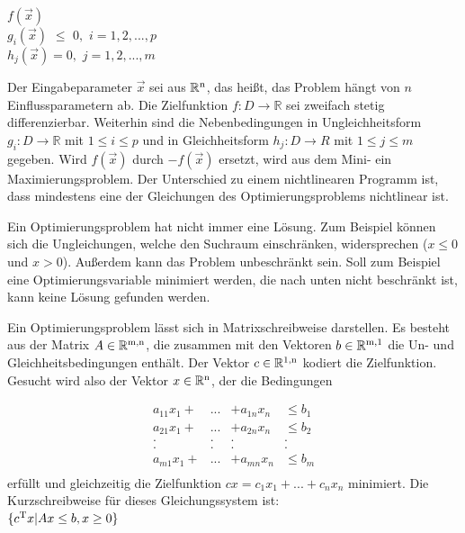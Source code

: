 \documentclass{like}
\begin{document}
\noindent\hspace*{3mm}%
$f(\vec{x}) $ \\
\noindent\hspace*{3mm}%
$g_i(\vec{x})$ $\leq$ $0,$ $i=1,2,...,p$  \\
\noindent\hspace*{50mm}%
$h_j(\vec{x})= 0,$ $j= 1,2,...,m$\\ 
\noindent\hspace*{50mm}%


Der Eingabeparameter $\vec{x}$ sei aus $\mathbb{R} \textsuperscript{n} $, das heißt, das Problem hängt von \(n\) Einflussparametern ab. Die Zielfunktion $f:D \rightarrow \mathbb{R} $ sei zweifach stetig differenzierbar. Weiterhin sind die Nebenbedingungen in Ungleichheitsform $g_i:D \rightarrow \mathbb{R}$ mit $1\leq i \leq p$ und in Gleichheitsform $h_j:D \rightarrow \!R$ mit $1\leq j \leq m$ gegeben.
Wird \(f(\vec{x})\) durch \(-f(\vec{x})\) ersetzt, wird aus dem Mini- ein Maximierungsproblem. Der Unterschied zu einem nichtlinearen Programm ist, dass mindestens eine der Gleichungen des Optimierungsproblems nichtlinear ist.

Ein Optimierungsproblem hat nicht immer eine Lösung. Zum Beispiel können sich die  Ungleichungen, welche den Suchraum einschränken, widersprechen ($x \leq 0 $ und $x > 0$). Außerdem kann das Problem unbeschränkt sein. Soll zum Beispiel eine Optimierungsvariable minimiert werden, die nach unten nicht beschränkt ist, kann keine Lösung gefunden werden. 

Ein Optimierungsproblem lässt sich in Matrixschreibweise darstellen. Es besteht aus der Matrix $A \in \mathbb{R} \textsuperscript{m,n}$, die zusammen mit den Vektoren $b \in \mathbb{R} \textsuperscript{m,1}$ die Un- und Gleichheitsbedingungen enthält. Der Vektor $c \in \mathbb{R} \textsuperscript{1,n}$ kodiert die Zielfunktion. Gesucht wird also der Vektor $x \in \mathbb{R} \textsuperscript{n}$, der die Bedingungen

\[  \begin{array}{cccc}
a_{11} x_1 + & ... & + a_{1n} x_n & \leq b_1 \\   	
a_{21} x_1 + & ... & + a_{2n} x_n & \leq b_2 \\ 
. & . & . & . \\
. & . & . & . \\
a_{m1} x_1 + & ... & + a_{mn} x_n & \leq b_m \\
\end{array}\] 
erfüllt und gleichzeitig die Zielfunktion 
$cx=c_1 x_1 + ... + c_n x_n$ minimiert.
Die Kurzschreibweise für dieses Gleichungssystem ist: \\
 $\{ c\textsuperscript{T}x | Ax \leq b, x \geq 0 \}$
\end{document}
